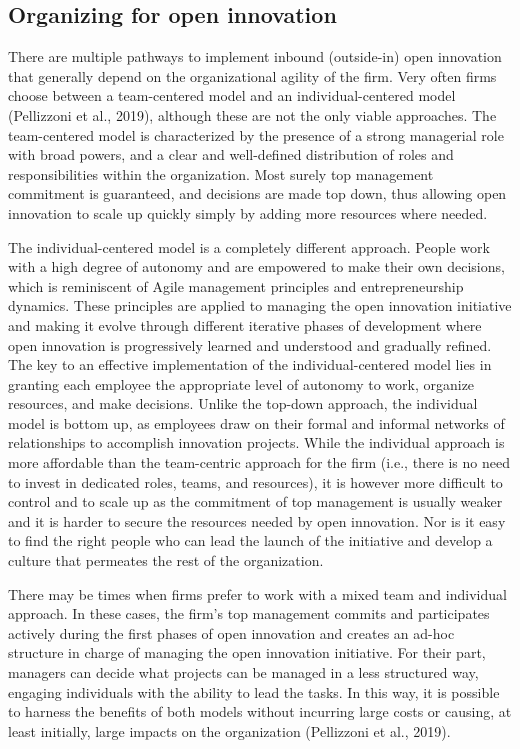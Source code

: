\documentclass[
  letterpaper,
  DIV=11,
  numbers=noendperiod]{scrreprt}
\begin{document}
\hypertarget{organizing-for-open-innovation}{%
\subsection{Organizing for open
innovation}\label{organizing-for-open-innovation}}

There are multiple pathways to implement inbound (outside-in) open
innovation that generally depend on the organizational agility of the
firm. Very often firms choose between a team-centered model and an
individual-centered model (Pellizzoni et al., 2019), although these are
not the only viable approaches. The team-centered model is characterized
by the presence of a strong managerial role with broad powers, and a
clear and well-defined distribution of roles and responsibilities within
the organization. Most surely top management commitment is guaranteed,
and decisions are made top down, thus allowing open innovation to scale
up quickly simply by adding more resources where needed.

The individual-centered model is a completely different approach. People
work with a high degree of autonomy and are empowered to make their own
decisions, which is reminiscent of Agile management principles and
entrepreneurship dynamics. These principles are applied to managing the
open innovation initiative and making it evolve through different
iterative phases of development where open innovation is progressively
learned and understood and gradually refined. The key to an effective
implementation of the individual-centered model lies in granting each
employee the appropriate level of autonomy to work, organize resources,
and make decisions. Unlike the top-down approach, the individual model
is bottom up, as employees draw on their formal and informal networks of
relationships to accomplish innovation projects. While the individual
approach is more affordable than the team-centric approach for the firm
(i.e., there is no need to invest in dedicated roles, teams, and
resources), it is however more difficult to control and to scale up as
the commitment of top management is usually weaker and it is harder to
secure the resources needed by open innovation. Nor is it easy to find
the right people who can lead the launch of the initiative and develop a
culture that permeates the rest of the organization.

There may be times when firms prefer to work with a mixed team and
individual approach. In these cases, the firm's top management commits
and participates actively during the first phases of open innovation and
creates an ad-hoc structure in charge of managing the open innovation
initiative. For their part, managers can decide what projects can be
managed in a less structured way, engaging individuals with the ability
to lead the tasks. In this way, it is possible to harness the benefits
of both models without incurring large costs or causing, at least
initially, large impacts on the organization (Pellizzoni et al., 2019).
\end{document}
